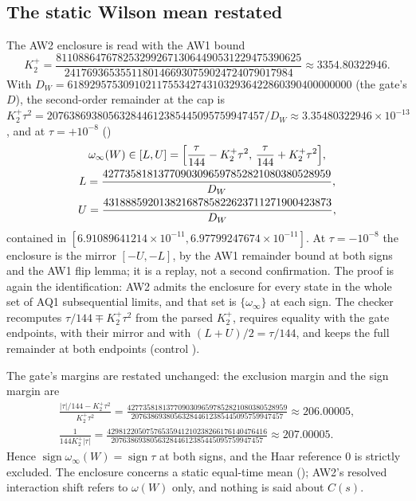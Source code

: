 \subsection{The static Wilson mean restated}
\label{sec:bc1-mean}
The AW2 enclosure is read with the AW1 bound
\begin{equation}
 K_2^+=\frac{81108864767825329926713064490531229475390625}{24176936535511801466930759024724079017984}\approx3354.80322946 .
 \label{eq:bc1-K2plus}
\end{equation}
With $D_W=618929575309102117553427431032936422860390400000000$ (the gate's
$D$), the second-order remainder at the cap is
$K_2^+\tau^2=207638693805632844612385445095759947457/D_W\approx3.35480322946\times10^{-13}$,
and at $\tau=+10^{-8}$ ()
\begin{equation}
 \begin{gathered}
 \omega_\infty(W)\in[L,U]=\Bigl[\frac\tau{144}-K_2^+\tau^2,\,\frac\tau{144}+K_2^+\tau^2\Bigr],\\
 L=\frac{42773581813770903096597852821080380528959}{D_W},\\
 U=\frac{43188859201382168785822623711271900423873}{D_W},
 \end{gathered}
 \label{eq:bc1-mean}
\end{equation}
contained in $[6.91089641214\times10^{-11},6.97799247674\times10^{-11}]$. At
$\tau=-10^{-8}$ the enclosure is the mirror $[-U,-L]$, by the AW1 remainder
bound at both signs and the AW1 flip lemma; it is a replay, not a second
confirmation. The proof is again the identification: AW2 admits the
enclosure for every state in the whole set of AQ1 subsequential limits, and
that set is $\{\omega_\infty\}$ at each sign. The checker recomputes
$\tau/144\mp K_2^+\tau^2$ from the parsed $K_2^+$, requires equality with the
gate endpoints, with their mirror and with $(L+U)/2=\tau/144$, and keeps the
full remainder at both endpoints (control
).

The gate's margins are restated unchanged: the exclusion margin and the sign
margin are
\begin{equation}
 \begin{gathered}
 \frac{|\tau|/144-K_2^+\tau^2}{K_2^+\tau^2}=\frac{42773581813770903096597852821080380528959}{207638693805632844612385445095759947457}\approx206.00005,\\
 \frac1{144K_2^+|\tau|}=\frac{42981220507576535941210238266176140476416}{207638693805632844612385445095759947457}\approx207.00005.
 \end{gathered}
 \label{eq:bc1-margins}
\end{equation}
Hence $\operatorname{sign}\omega_\infty(W)=\operatorname{sign}\tau$ at both
signs, and the Haar reference 0 is strictly excluded. The enclosure concerns
a static equal-time mean (); AW2's resolved
interaction shift refers to $\omega(W)$ only, and nothing is said about
$C(s)$.

